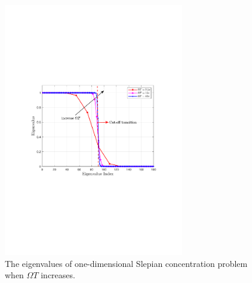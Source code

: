 \documentclass[12pt,draftclsnofoot,journal,onecolumn]{IEEEtran}
\begin{document}
	\begin{figure}
		\centering 
		\includegraphics[width=0.7\textwidth]{figs/save_1d_different_omegaT.pdf} 
		\caption{The eigenvalues of one-dimensional Slepian concentration problem when $\Omega T$ increases.} 
		\label{1d_omegaT}
	\end{figure}
	
\end{document}
